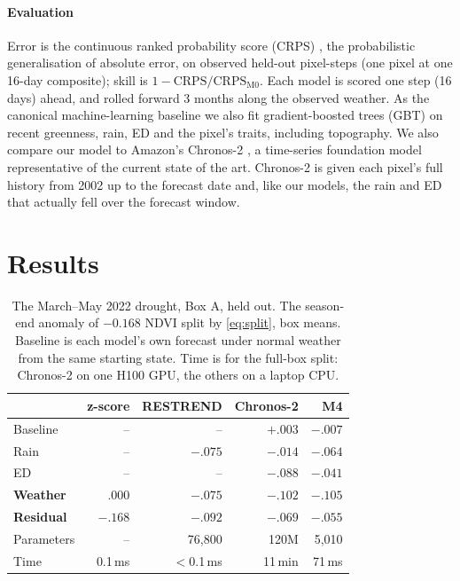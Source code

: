 \documentclass[letterpaper]{article} %
\begin{document}
\paragraph{Evaluation} Error is the continuous ranked probability score (CRPS) \citep{gneiting2007}, the probabilistic generalisation of absolute error, on observed held-out pixel-steps (one pixel at one 16-day composite); skill is $1-\mathrm{CRPS}/\mathrm{CRPS}_{\mathrm{M0}}$. Each model is scored one step (16 days) ahead, and rolled forward 3 months along the observed weather. As the canonical machine-learning baseline we also fit gradient-boosted trees (GBT) \citep{friedman2001} on recent greenness, rain, ED and the pixel's traits, including topography. We also compare our model to Amazon's Chronos-2 \citep{chronos2}, a time-series foundation model representative of the current state of the art. Chronos-2 is given each pixel's full history from 2002 up to the forecast date and, like our models, the rain and ED that actually fell over the forecast window.

\section{Results}

\begin{table}[t]\centering\footnotesize\setlength{\tabcolsep}{4pt}
\caption{The March--May 2022 drought, Box A, held out. The season-end anomaly of $-0.168$ NDVI split by \eqref{eq:split}, box means. Baseline is each model's own forecast under normal weather from the same starting state. Time is for the full-box split: Chronos-2 on one H100 GPU, the others on a laptop CPU.}\label{tab:drought}
\begin{tabular}{lrrrr}\toprule
 & z-score & RESTREND & Chronos-2 & M4\\\midrule
Baseline & -- & -- & $+.003$ & $-.007$\\
Rain & -- & $-.075$ & $-.014$ & $-.064$\\
ED & -- & -- & $-.088$ & $-.041$\\
\textbf{Weather} & $\mathbf{.000}$ & $\mathbf{-.075}$ & $\mathbf{-.102}$ & $\mathbf{-.105}$\\
\textbf{Residual} & $\mathbf{-.168}$ & $\mathbf{-.092}$ & $\mathbf{-.069}$ & $\mathbf{-.055}$\\\midrule
Parameters & -- & 76,800 & 120M & 5,010\\
Time & 0.1\,ms & $<$0.1\,ms & 11\,min & 71\,ms\\\bottomrule
\end{tabular}
\end{table}
\end{document}
